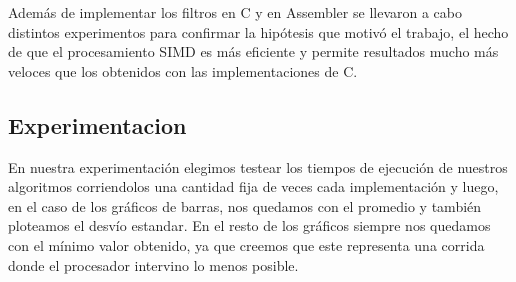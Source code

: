 \par{Además de implementar los filtros en C y en Assembler se llevaron a cabo distintos experimentos para confirmar la hipótesis que motivó el trabajo, el hecho de que el procesamiento SIMD es más eficiente y permite resultados mucho más veloces que los obtenidos con las implementaciones de C.}

\subsection{Experimentacion}
\par{En nuestra experimentación elegimos testear los tiempos de ejecución de nuestros algoritmos corriendolos una cantidad fija de veces cada implementación y luego, en el caso de los gráficos de barras, nos quedamos con el promedio y también ploteamos el desvío estandar. En el resto de los gráficos siempre nos quedamos con el mínimo valor obtenido, ya que creemos que este representa una corrida donde el procesador intervino lo menos posible.}